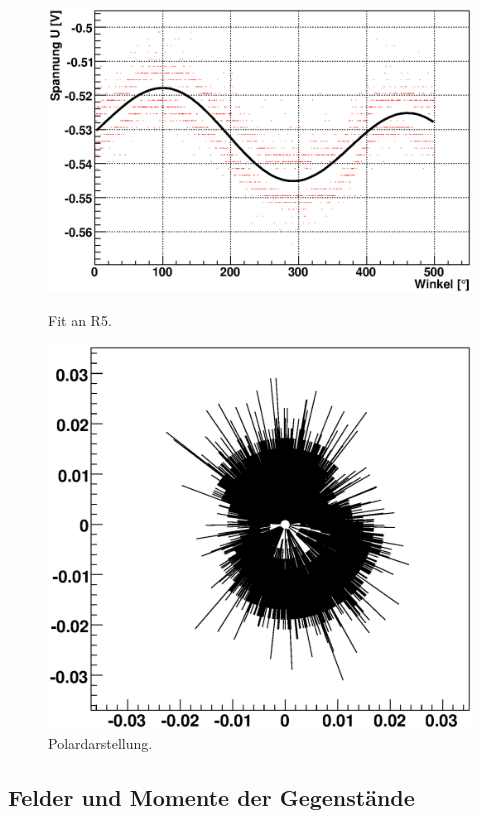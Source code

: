 \documentclass[12pt]{article}
\begin{document}
\begin{figure}[H]  
\begin{minipage}{0.5\linewidth}
\centering
\includegraphics[width=0.9\linewidth]{pictures/R5.eps}
\caption{Fit an R5.}
\end{minipage}
\begin{minipage}{0.5\linewidth}
\centering 
\includegraphics[width=0.9\linewidth]{pictures/R5vd.eps}
\caption{Polardarstellung.}
\end{minipage}
\end{figure}

\subsection{Felder und Momente der Gegenstände}
\end{document}
